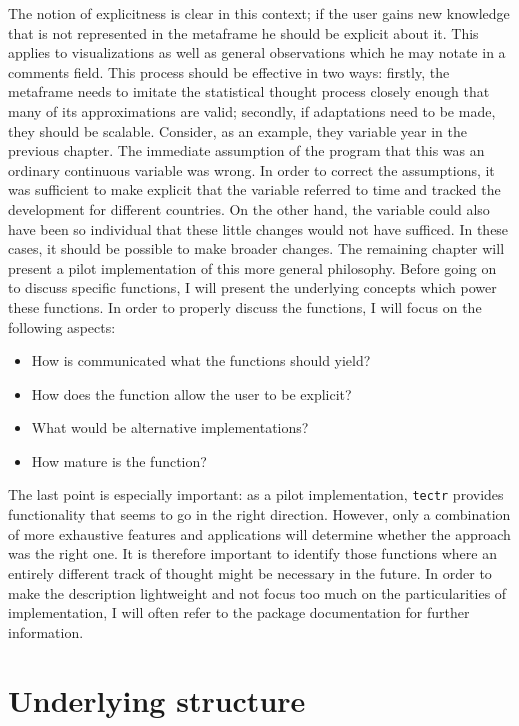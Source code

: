 \documentclass[]{report}
\theoremstyle{definition}
\theoremstyle{definition}
\theoremstyle{definition}
\theoremstyle{remark}
\begin{document}
The notion of explicitness is clear in this context; if the user gains
new knowledge that is not represented in the metaframe he should be
explicit about it. This applies to visualizations as well as general
observations which he may notate in a comments field. This process
should be effective in two ways: firstly, the metaframe needs to imitate
the statistical thought process closely enough that many of its
approximations are valid; secondly, if adaptations need to be made, they
should be scalable. Consider, as an example, they variable year in the
previous chapter. The immediate assumption of the program that this was
an ordinary continuous variable was wrong. In order to correct the
assumptions, it was sufficient to make explicit that the variable
referred to time and tracked the development for different countries. On
the other hand, the variable could also have been so individual that
these little changes would not have sufficed. In these cases, it should
be possible to make broader changes. The remaining chapter will present
a pilot implementation of this more general philosophy. Before going on
to discuss specific functions, I will present the underlying concepts
which power these functions. In order to properly discuss the functions,
I will focus on the following aspects:

\begin{itemize}
\item
  How is communicated what the functions should yield?
\item
  How does the function allow the user to be explicit?
\item
  What would be alternative implementations?
\item
  How mature is the function?
\end{itemize}

The last point is especially important: as a pilot implementation,
\texttt{tectr} provides functionality that seems to go in the right
direction. However, only a combination of more exhaustive features and
applications will determine whether the approach was the right one. It
is therefore important to identify those functions where an entirely
different track of thought might be necessary in the future. In order to
make the description lightweight and not focus too much on the
particularities of implementation, I will often refer to the package
documentation for further information.

\section{Underlying structure}\label{underlying-structure}
\end{document}
